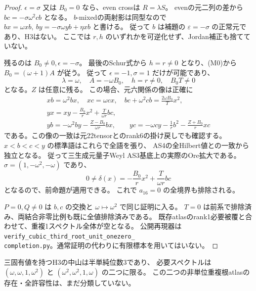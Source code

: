 \begin{proof}
$\epsilon=\sigma$ 又は $B_0=0$ なら、even crossは $R=\lambda S$。
evenの元二列の差から $bc=-\sigma\omega^2cb$ となる。
$b$-mixedの両射影は同型なので
$bx=\omega xb,\ by=-\sigma\omega yb+\eta xb$ と書ける。
従って $b$ は補題の $\varepsilon=-\sigma$ の正常元であり、H3はない。
ここでは $r,h$ のいずれかを可逆化せず、Jordan補正も捨てていない。

残るのは $B_0\ne0,\epsilon=-\sigma$。
最後のSchur式から $h=r\ne0$ となり、(M0)から
$B_0=(\omega+1)A$ が従う。
従って $\epsilon=-1,\sigma=1$ だけが可能であり、
\[
 \lambda=\omega,\quad A=-\omega B_0,\quad h=r\ne0,
 \quad B_0T\ne0
\]
となる。$Z$ は任意に残る。
この場合、元六関係の像は正確に
\begin{gather*}
 xb=\omega^2bx,\quad xc=\omega cx,\quad
 bc+\omega^2cb=\frac{2\omega B_0}{T}x^2,\\
 yx=xy-\frac{B_0}{r}x^2+\frac{T}{\omega r}bc,\\
 yb=-\omega^2by-\frac{Z-B_0}{\omega r}bx,\qquad
 yc=-\omega cy-\frac1r b^2-\frac{Z+B_0}{r}xc
\end{gather*}
である。この像の一致は元22tensorとのrank6の掛け戻しでも確認する。
$x<b<c<y$ の標準語はこれらで全語を張り、
AS4の全Hilbert値との一致から独立となる。
従って三生成元量子Weyl AS3基底上の実際のOre拡大である。
$\sigma=(1,-\omega^2,-\omega)$ であり、
\[
 0\ne\delta(x)=-\frac{B_0}{r}x^2+\frac{T}{\omega r}bc
\]
となるので、前命題が適用できる。
これで $a_{16}=0$ の全境界も排除される。

$P=0,Q\ne0$ は $b,c$ の交換と $\omega\mapsto\omega^2$ で同じ証明に入る。
$T=0$ は前系で排除済み、両結合非零比例も既に全値排除済みである。
既存atlasのrank1必要被覆と合わせて、重複1スペクトル全体が空となる。
公開再現器は \texttt{verify\_cubic\_third\_root\_unit\_onezero\_}\\
\texttt{completion.py}。通常証明の代わりに有限標本を用いてはいない。
\end{proof}

\begin{corollary}
三固有値を持つH3の中山は半単純位数3であり、
必要スペクトルは $(\omega,\omega,1,\omega^2)$ と
$(\omega^2,\omega^2,1,\omega)$ の二つに限る。
この二つの非単位重複根atlasの存在・全許容性は、まだ分類していない。
\end{corollary}
